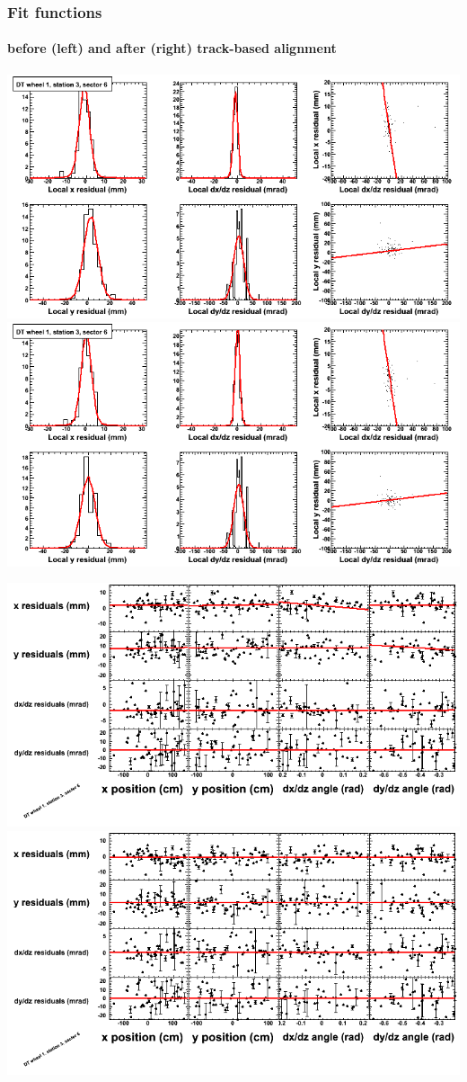 \documentclass[compress]{beamer}
\begin{document}
\begin{frame}
\frametitle{Fit functions}
\framesubtitle{before (left) and after (right) track-based alignment}
\includegraphics[width=0.5\linewidth]{fitfunctions_re01/MBwhDst3sec06_bellcurves.png} \includegraphics[width=0.5\linewidth]{fitfunctions_re05/MBwhDst3sec06_bellcurves.png}

\includegraphics[width=0.5\linewidth]{fitfunctions_re01/MBwhDst3sec06_polynomials.png} \includegraphics[width=0.5\linewidth]{fitfunctions_re05/MBwhDst3sec06_polynomials.png}
\end{frame}
\end{document}
